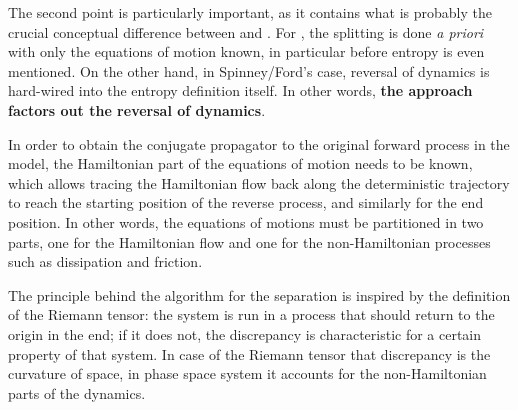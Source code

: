 The second point is particularly important, as it contains what is probably the crucial conceptual difference between \HF{} and \SF{}. For \HF{}, the splitting is done \emph{a priori} with only the equations of motion known, in particular before entropy is even mentioned. On the other hand, in Spinney/Ford's case, reversal of dynamics is hard-wired into the entropy definition itself. In other words, \textbf{the \HF{} approach factors out the reversal of dynamics}.

In order to obtain the conjugate propagator to the original forward process in the \HF{} model, the Hamiltonian part of the equations of motion needs to be known, which allows tracing the Hamiltonian flow back along the deterministic trajectory to reach the starting position of the reverse process, and similarly for the end position. In other words, the equations of motions must be partitioned in two parts, one for the Hamiltonian flow and one for the non-Hamiltonian processes such as dissipation and friction.

The principle behind the algorithm for the separation is inspired by the definition of the Riemann tensor: the system is run in a process that should return to the origin in the end; if it does not, the discrepancy is characteristic for a certain property of that system. In case of the Riemann tensor that discrepancy is the curvature of space, in phase space system it accounts for the non-Hamiltonian parts of the dynamics.


